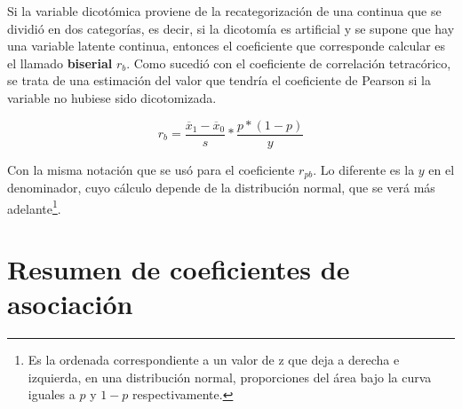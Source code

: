 \documentclass[]{book}
\let\rmarkdownfootnote\footnote%
\def\footnote{\protect\rmarkdownfootnote}
\begin{document}
Si la variable dicotómica proviene de la recategorización de una
continua que se dividió en dos categorías, es decir, si la dicotomía es artificial y se supone que hay una variable latente continua, entonces el coeficiente que corresponde calcular es el llamado \textbf{biserial} \(r_{b}\). Como sucedió con el coeficiente de correlación tetracórico, se trata de una estimación del valor que tendría el coeficiente de Pearson si la variable no hubiese sido dicotomizada.

\[r_{b} = \frac{{\overline{x}}_{1} - {\overline{x}}_{0}}{s}*\frac{p*(1 - p)}{y}\]

Con la misma notación que se usó para el coeficiente \(r_{pb}\). Lo diferente es la \(y\) en el denominador, cuyo cálculo depende de la
distribución normal, que se verá más adelante\footnote{Es la ordenada correspondiente a un valor de z que deja a derecha e izquierda, en una distribución normal, proporciones del área bajo la curva iguales a \(p\) y \(1-p\) respectivamente.}.

\hypertarget{resumen-de-coeficientes-de-asociacion}{%
\section{Resumen de coeficientes de asociación}\label{resumen-de-coeficientes-de-asociacion}}
\end{document}
